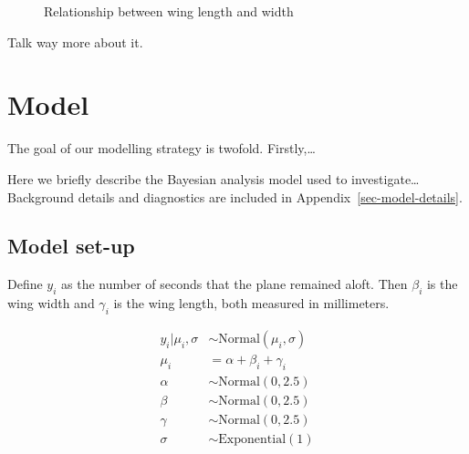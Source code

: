 \documentclass[
  letterpaper,
  DIV=11,
  numbers=noendperiod]{scrartcl}
\begin{document}
\begin{figure}


\caption{\label{fig-planes}Relationship between wing length and width}

\end{figure}%

Talk way more about it.

\section{Model}\label{model}

The goal of our modelling strategy is twofold. Firstly,\ldots{}

Here we briefly describe the Bayesian analysis model used to
investigate\ldots{} Background details and diagnostics are included in
Appendix~\ref{sec-model-details}.

\subsection{Model set-up}\label{model-set-up}

Define \(y_i\) as the number of seconds that the plane remained aloft.
Then \(\beta_i\) is the wing width and \(\gamma_i\) is the wing length,
both measured in millimeters.

\begin{align} 
y_i|\mu_i, \sigma &\sim \mbox{Normal}(\mu_i, \sigma) \\
\mu_i &= \alpha + \beta_i + \gamma_i\\
\alpha &\sim \mbox{Normal}(0, 2.5) \\
\beta &\sim \mbox{Normal}(0, 2.5) \\
\gamma &\sim \mbox{Normal}(0, 2.5) \\
\sigma &\sim \mbox{Exponential}(1)
\end{align}
\end{document}
